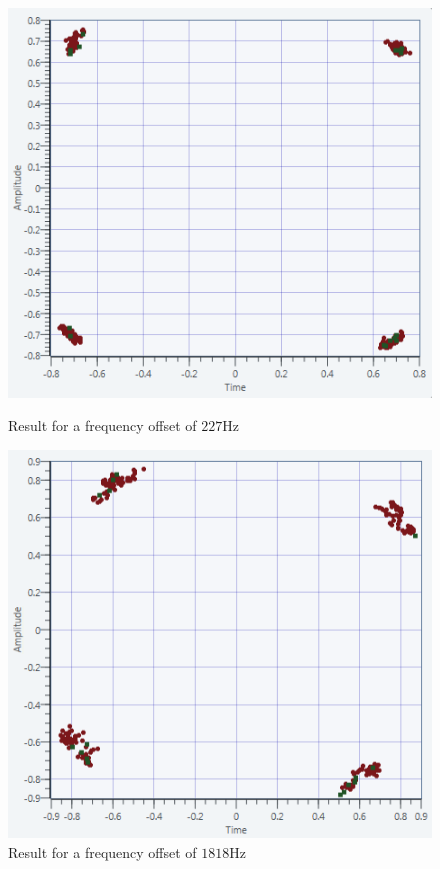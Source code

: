 \documentclass[frenchb, oneside, headings=normal]{scrartcl}
\begin{document}
\begin{figure}[!ht]
  \begin{minipage}[b]{0.48\linewidth}
        \centering \includegraphics[scale=0.7]{img/USRP_carrieroffset_227.PNG}
    \caption{Result for a frequency offset of $227 \si{\hertz}$}
    \label{fig8}
    \end{minipage}\hfill
    \begin{minipage}[b]{0.48\linewidth}
         \centering \includegraphics[scale=0.7]{img/USRP_carrieroffset_1818.PNG}
          \caption{Result for a frequency offset of $1818 \si{\hertz}$}
          \label{fig9}
    \end{minipage}
\end{figure}
\end{document}
